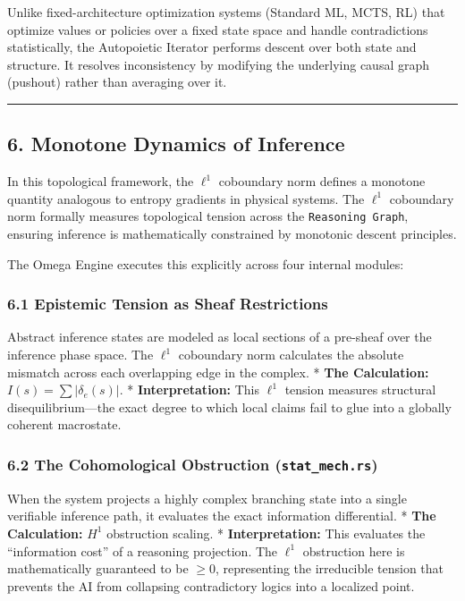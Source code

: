 \documentclass[
]{article}
\begin{document}
Unlike fixed-architecture optimization systems (Standard ML, MCTS, RL)
that optimize values or policies over a fixed state space and handle
contradictions statistically, the Autopoietic Iterator performs descent
over both state and structure. It resolves inconsistency by modifying
the underlying causal graph (pushout) rather than averaging over it.

\begin{center}\rule{0.5\linewidth}{0.5pt}\end{center}

\subsection{6. Monotone Dynamics of
Inference}\label{monotone-dynamics-of-inference}

In this topological framework, the \(\ell^1\) coboundary norm defines a
monotone quantity analogous to entropy gradients in physical systems.
The \(\ell^1\) coboundary norm formally measures topological tension
across the \texttt{Reasoning\ Graph}, ensuring inference is
mathematically constrained by monotonic descent principles.

The Omega Engine executes this explicitly across four internal modules:

\subsubsection{6.1 Epistemic Tension as Sheaf
Restrictions}\label{epistemic-tension-as-sheaf-restrictions}

Abstract inference states are modeled as local sections of a pre-sheaf
over the inference phase space. The \(\ell^1\) coboundary norm
calculates the absolute mismatch across each overlapping edge in the
complex. * \textbf{The Calculation:} \(I(s) = \sum |\delta_e(s)|\). *
\textbf{Interpretation:} This \(\ell^1\) tension measures structural
disequilibrium---the exact degree to which local claims fail to glue
into a globally coherent macrostate.

\subsubsection{\texorpdfstring{6.2 The Cohomological Obstruction
(\texttt{stat\_mech.rs})}{6.2 The Cohomological Obstruction (stat\_mech.rs)}}\label{the-cohomological-obstruction-stat_mech.rs}

When the system projects a highly complex branching state into a single
verifiable inference path, it evaluates the exact information
differential. * \textbf{The Calculation:} \(H^1\) obstruction scaling. *
\textbf{Interpretation:} This evaluates the ``information cost'' of a
reasoning projection. The \(\ell^1\) obstruction here is mathematically
guaranteed to be \(\ge 0\), representing the irreducible tension that
prevents the AI from collapsing contradictory logics into a localized
point.
\end{document}
